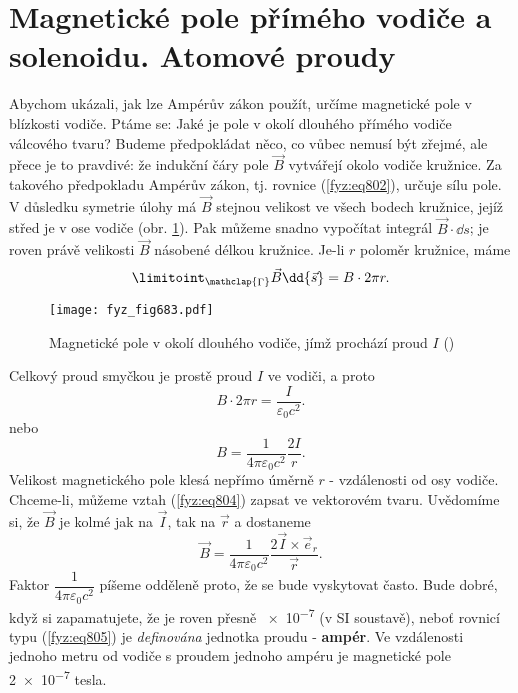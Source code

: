   \section{Magnetické pole přímého vodiče a solenoidu. Atomové proudy}\label{fyz:IIchapXIIIsecV}
    Abychom ukázali, jak lze Ampérův zákon použít, určíme magnetické pole v blízkosti vodiče. Ptáme
    se: Jaké je pole v okolí dlouhého přímého vodiče válcového tvaru? Budeme předpokládat něco, co
    vůbec nemusí být zřejmé, ale přece je to pravdivé: že indukční čáry pole \(\vec{B}\) vytvářejí
    okolo vodiče kružnice. Za takového předpokladu Ampérův zákon, tj. rovnice (\ref{fyz:eq802}),
    určuje sílu pole. V důsledku symetrie úlohy má \(\vec{B}\) stejnou velikost ve všech bodech
    kružnice, jejíž střed je v ose vodiče (obr. \ref{fyz:fig683}). Pak můžeme snadno vypočítat
    integrál \(\vec{B}\cdot\dd{s}\); je roven právě velikosti \(\vec{B}\) násobené délkou kružnice.
    Je-li \(r\) poloměr kružnice, máme
    \begin{equation}\label{fyz:eq803}
      \limitoint_{\mathclap{\substack{\Gamma}}}\vec{B}\dd{\vec{s}} = B\cdot2\pi r.
    \end{equation}

    \begin{figure}[ht!] %
      \centering
      \texttt{[image: fyz\_fig683.pdf]}
      \caption{Magnetické pole v okolí dlouhého vodiče, jímž prochází proud \(I\)
              (\cite[s.~707]{Feynman02})}
      \label{fyz:fig683}
    \end{figure}

    Celkový proud smyčkou je prostě proud \(I\) ve vodiči, a proto
    \begin{equation*}
      B\cdot2\pi r = \dfrac{I}{\varepsilon_0c^2}.
    \end{equation*}
    nebo
    \begin{equation}\label{fyz:eq804}
      B = \dfrac{1}{4\pi\varepsilon_0c^2}\dfrac{2I}{r}.
    \end{equation}  
    Velikost magnetického pole klesá nepřímo úměrně \(r\) - vzdálenosti od osy vodiče. Chceme-li,
    můžeme vztah (\ref{fyz:eq804}) zapsat ve vektorovém tvaru. Uvědomíme si, že \(\vec{B}\) je kolmé
    jak na \(\vec{I}\), tak na \(\vec{r}\) a dostaneme
    \begin{equation}\label{fyz:eq805}
      \vec{B} = \dfrac{1}{4\pi\varepsilon_0c^2}\dfrac{2\vec{I}\times\vec{e}_r}{\vec{r}}.
    \end{equation} 
    Faktor \(\dfrac{1}{4\pi\varepsilon_0c^2}\) píšeme odděleně proto, že se bude vyskytovat často.
    Bude dobré, když si zapamatujete, že je roven přesně \num{e-7} (v SI soustavě), neboť rovnicí
    typu (\ref{fyz:eq805}) je \emph{definována} jednotka proudu - \textbf{ampér}. Ve vzdálenosti
    jednoho metru od vodiče s proudem jednoho ampéru je magnetické pole \num{2e-7} tesla.

